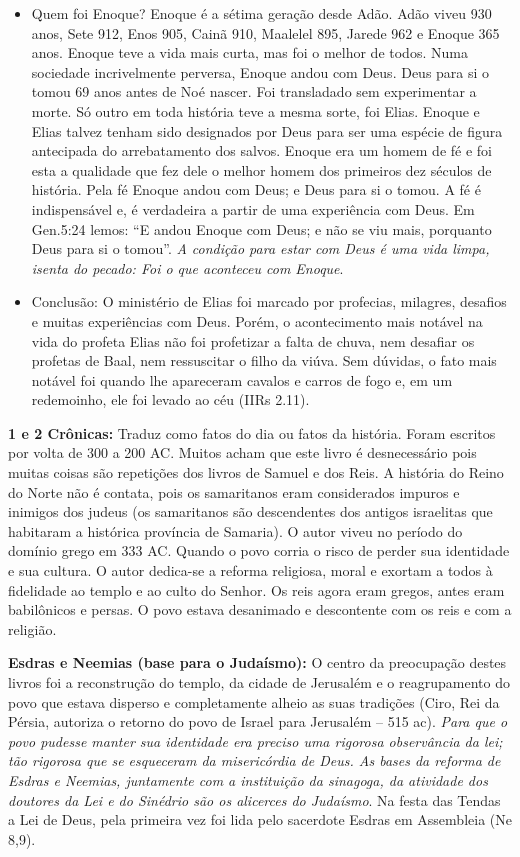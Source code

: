 \documentclass[
]{book}
\begin{document}
\begin{itemize}
\begin{enumerate}
  \end{enumerate}
\item
  Quem foi Enoque? Enoque é a sétima geração desde Adão. Adão viveu 930 anos, Sete 912, Enos 905, Cainã 910, Maalelel 895, Jarede 962 e Enoque 365 anos. Enoque teve a vida mais curta, mas foi o melhor de todos. Numa sociedade incrivelmente perversa, Enoque andou com Deus. Deus para si o tomou 69 anos antes de Noé nascer. Foi transladado sem experimentar a morte. Só outro em toda história teve a mesma sorte, foi Elias. Enoque e Elias talvez tenham sido designados por Deus para ser uma espécie de figura antecipada do arrebatamento dos salvos. Enoque era um homem de fé e foi esta a qualidade que fez dele o melhor homem dos primeiros dez séculos de história. Pela fé Enoque andou com Deus; e Deus para si o tomou. A fé é indispensável e, é verdadeira a partir de uma experiência com Deus. Em Gen.5:24 lemos: ``E andou Enoque com Deus; e não se viu mais, porquanto Deus para si o tomou''. \emph{A condição para estar com Deus é uma vida limpa, isenta do pecado: Foi o que aconteceu com Enoque}.
\item
  Conclusão: O ministério de Elias foi marcado por profecias, milagres, desafios e muitas experiências com Deus. Porém, o acontecimento mais notável na vida do profeta Elias não foi profetizar a falta de chuva, nem desafiar os profetas de Baal, nem ressuscitar o filho da viúva. Sem dúvidas, o fato mais notável foi quando lhe apareceram cavalos e carros de fogo e, em um redemoinho, ele foi levado ao céu (IIRs 2.11).
\end{itemize}

\textbf{1 e 2 Crônicas:} Traduz como fatos do dia ou fatos da história. Foram escritos por volta de 300 a 200 AC. Muitos acham que este livro é desnecessário pois muitas coisas são repetições dos livros de Samuel e dos Reis. A história do Reino do Norte não é contata, pois os samaritanos eram considerados impuros e inimigos dos judeus (os samaritanos são descendentes dos antigos israelitas que habitaram a histórica província de Samaria). O autor viveu no período do domínio grego em 333 AC. Quando o povo corria o risco de perder sua identidade e sua cultura. O autor dedica-se a reforma religiosa, moral e exortam a todos à fidelidade ao templo e ao culto do Senhor. Os reis agora eram gregos, antes eram babilônicos e persas. O povo estava desanimado e descontente com os reis e com a religião.

\textbf{Esdras e Neemias (base para o Judaísmo):} O centro da preocupação destes livros foi a reconstrução do templo, da cidade de Jerusalém e o reagrupamento do povo que estava disperso e completamente alheio as suas tradições (Ciro, Rei da Pérsia, autoriza o retorno do povo de Israel para Jerusalém -- 515 ac). \emph{Para que o povo pudesse manter sua identidade era preciso uma rigorosa observância da lei; tão rigorosa que se esqueceram da misericórdia de Deus. As bases da reforma de Esdras e Neemias, juntamente com a instituição da sinagoga, da atividade dos doutores da Lei e do Sinédrio são os alicerces do Judaísmo}. Na festa das Tendas a Lei de Deus, pela primeira vez foi lida pelo sacerdote Esdras em Assembleia (Ne 8,9).
\end{document}
